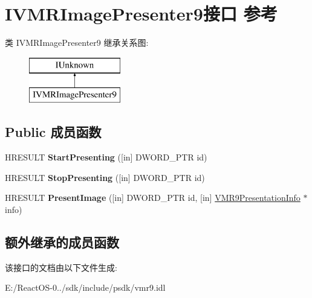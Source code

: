 \hypertarget{interface_i_v_m_r_image_presenter9}{}\section{I\+V\+M\+R\+Image\+Presenter9接口 参考}
\label{interface_i_v_m_r_image_presenter9}
类 I\+V\+M\+R\+Image\+Presenter9 继承关系图\+:\begin{figure}[H]
\begin{center}
\leavevmode
\includegraphics[height=2.000000cm]{interface_i_v_m_r_image_presenter9}
\end{center}
\end{figure}
\subsection*{Public 成员函数}
\begin{DoxyCompactItemize}
\item 
\mbox{\label{interface_i_v_m_r_image_presenter9_acadde2fc9ae69ba53c864c02df89e92c}} 
H\+R\+E\+S\+U\+LT {\bfseries Start\+Presenting} (\mbox{[}in\mbox{]} D\+W\+O\+R\+D\+\_\+\+P\+TR id)
\item 
\mbox{\label{interface_i_v_m_r_image_presenter9_aa94d0d745356cc37158acc138014f87c}} 
H\+R\+E\+S\+U\+LT {\bfseries Stop\+Presenting} (\mbox{[}in\mbox{]} D\+W\+O\+R\+D\+\_\+\+P\+TR id)
\item 
\mbox{\label{interface_i_v_m_r_image_presenter9_a6587efa7ca8784632b1590eaa8fab547}} 
H\+R\+E\+S\+U\+LT {\bfseries Present\+Image} (\mbox{[}in\mbox{]} D\+W\+O\+R\+D\+\_\+\+P\+TR id, \mbox{[}in\mbox{]} \hyperlink{struct___v_m_r9_presentation_info}{V\+M\+R9\+Presentation\+Info} $\ast$info)
\end{DoxyCompactItemize}
\subsection*{额外继承的成员函数}


该接口的文档由以下文件生成\+:\begin{DoxyCompactItemize}
\item 
E\+:/\+React\+O\+S-\/0../sdk/include/psdk/vmr9.\+idl\end{DoxyCompactItemize}
